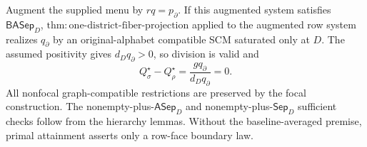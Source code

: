 Augment the supplied menu by \(rq=p_\partial\).  If this augmented system satisfies \(\mathsf{BASep}_D\), \(\mathrm{thm:one\text{-}district\text{-}fiber\text{-}projection}\) applied to the augmented row system realizes \(q_\partial\) by an original-alphabet compatible SCM saturated only at \(D\).  The assumed positivity gives \(d_Dq_\partial>0\), so division is valid and
\[
Q_\sigma^\star-Q_\rho^\star
=\frac{gq_\partial}{d_Dq_\partial}=0.
\]
All nonfocal graph-compatible restrictions are preserved by the focal construction.  The nonempty-plus-\(\mathsf{ASep}_D\) and nonempty-plus-\(\mathsf{Sep}_D\) sufficient checks follow from the hierarchy lemmas.  Without the baseline-averaged premise, primal attainment asserts only a row-face boundary law.